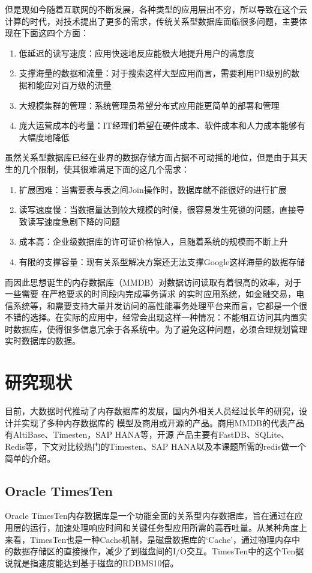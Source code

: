 \documentclass[proposal]{zjutreport}
\begin{document}
但是现如今随着互联网的不断发展，各种类型的应用层出不穷，所以导致在这个云计算的时代，对技术提出了更多的需求，传统关系型数据库面临很多问题，主要体现在下面这四个方面：
\begin{enumerate}[label=（\arabic*）]
\item{低延迟的读写速度：应用快速地反应能极大地提升用户的满意度}
\item{支撑海量的数据和流量：对于搜索这样大型应用而言，需要利用PB级别的数据和能应对百万级的流量}
\item{大规模集群的管理\cite{ref:2}：系统管理员希望分布式应用能更简单的部署和管理}
\item{庞大运营成本的考量：IT经理们希望在硬件成本、软件成本和人力成本能够有大幅度地降低}
\end{enumerate}

虽然关系型数据库已经在业界的数据存储方面占据不可动摇的地位，但是由于其天生的几个限制，使其很难满足下面的这几个需求：
\begin{enumerate}[label=（\arabic*）]
\item{扩展困难：当需要表与表之间Join操作时，数据库就不能很好的进行扩展}
\item{读写速度慢：当数据量达到较大规模的时候，很容易发生死锁的问题，直接导致读写速度急剧下降的问题}
\item{成本高：企业级数据库的许可证价格惊人，且随着系统的规模而不断上升}
\item{有限的支撑容量：现有关系型解决方案还无法支撑Google这样海量的数据存储}
\end{enumerate}

而因此思想诞生的内存数据库\cite{ref:3}（MMDB）对数据访问读取有着很高的效率，对于一些需要
在严格要求的时间段内完成事务请求
的实时应用系统，如金融交易\cite{ref:4}，电信系统等，和需要支持大量并发访问的高性能事务处理平台来而言，它都是一个很不错的选择。在实际的应用中，经常会出现这样一种情况：不能相互访问其内置实时数据库，使得很多信息冗余于各系统中。为了避免这种问题，必须合理规划管理实时数据库的数据。

\section{研究现状}
目前，大数据时代推动了内存数据库的发展，国内外相关人员经过长年的研究，设计并实现了多种内存数据库的
模型及商用或开源的产品。商用MMDB的代表产品有AltiBase、Timesten，SAP HANA等，开源
产品主要有FastDB、SQLite、Redis等，下文对比较热门的Timesten、SAP HANA以及本课题所需的redis做一个简单的介绍。

\subsection{Oracle TimesTen}
Oracle TimesTen\cite{ref:5}内存数据库是一个功能全面的关系型内存数据库，旨在通过在应用层的运行，加速处理响应时间和关键任务型应用所需的高吞吐量。从某种角度上来看，TimesTen也是一种Cache机制，是磁盘数据库的‘Cache’，通过物理内存中的数据存储区的直接操作，减少了到磁盘间的I/O交互。TimesTen中的这个Ten据说就是指速度能达到基于磁盘的RDBMS10倍。
\end{document}
